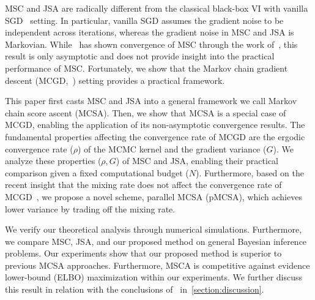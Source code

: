 MSC and JSA are radically different from the classical black-box VI with vanilla SGD~\citep{pmlr-v33-ranganath14, JMLR:v18:16-107} setting.
In particular, vanilla SGD assumes the gradient noise to be independent across iterations, whereas the gradient noise in MSC and JSA is Markovian.
While~\citet{NEURIPS2020_b2070693} has shown convergence of MSC through the work of~\citet{gu_stochastic_1998}, this result is only asymptotic and does not provide insight into the practical performance of MSC.
Fortunately, we show that the Markov chain gradient descent (MCGD,~\citealt{duchi_ergodic_2012, NEURIPS2018_1371bcce, pmlr-v99-karimi19a, doan_convergence_2020}) setting provides a practical framework.

This paper first casts MSC and JSA into a general framework we call Markov chain score ascent (MCSA).
Then, we show that MCSA is a special case of MCGD, enabling the application of its non-asymptotic convergence results.
The fundamental properties affecting the convergence rate of MCGD are the ergodic convergence rate (\(\rho\)) of the MCMC kernel and the gradient variance (\(G\)).
We analyze these properties (\(\rho, G\)) of MSC and JSA, enabling their practical comparison given a fixed computational budget (\(N\)).
Furthermore, based on the recent insight that the mixing rate does not affect the convergence rate of MCGD~\citet{doan_convergence_2020,doan_finitetime_2020}, we propose a novel scheme, parallel MCSA (pMCSA), which achieves lower variance by trading off the mixing rate.

We verify our theoretical analysis through numerical simulations.
Furthermore, we compare MSC, JSA, and our proposed method on general Bayesian inference problems.
Our experiments show that our proposed method is superior to previous MCSA approaches.
Furthermore, MSCA is competitive against evidence lower-bound (ELBO) maximization within our experiments.
We further discuss this result in relation with the conclusions of~\citet{dhaka_challenges_2021} in~\cref{section:discussion}.

\vspace{-0.05in}
